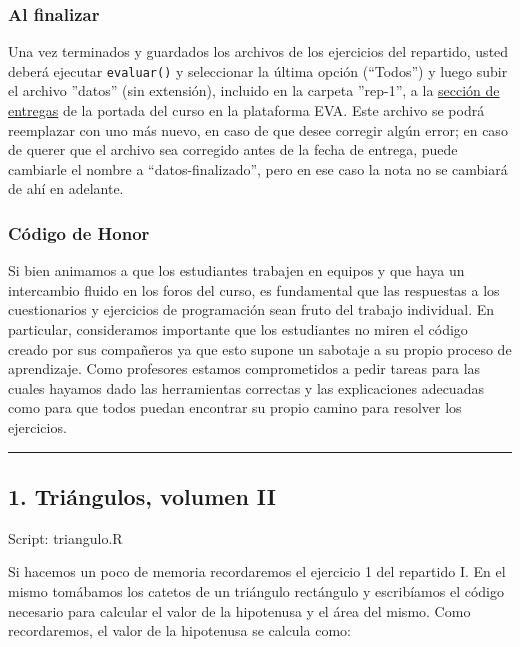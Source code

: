 \documentclass[]{article}
\begin{document}
\subsubsection{Al finalizar}

Una vez terminados y guardados los archivos de los ejercicios del
repartido, usted deberá ejecutar \texttt{evaluar()} y seleccionar la
última opción (``Todos'') y luego subir el archivo ''datos'' (sin
extensión), incluido en la carpeta ''rep-1'', a la
\href{http://eva.universidad.edu.uy/mod/assignment/view.php?id=95125}{sección
de entregas} de la portada del curso en la plataforma EVA. Este archivo
se podrá reemplazar con uno más nuevo, en caso de que desee corregir
algún error; en caso de querer que el archivo sea corregido antes de la
fecha de entrega, puede cambiarle el nombre a ``datos-finalizado'', pero
en ese caso la nota no se cambiará de ahí en adelante.

\subsubsection{Código de Honor}

Si bien animamos a que los estudiantes trabajen en equipos y que haya un
intercambio fluido en los foros del curso, es fundamental que las
respuestas a los cuestionarios y ejercicios de programación sean fruto
del trabajo individual. En particular, consideramos importante que los
estudiantes no miren el código creado por sus compañeros ya que esto
supone un sabotaje a su propio proceso de aprendizaje. Como profesores
estamos comprometidos a pedir tareas para las cuales hayamos dado las
herramientas correctas y las explicaciones adecuadas como para que todos
puedan encontrar su propio camino para resolver los ejercicios.

\begin{center}\rule{3in}{0.4pt}\end{center}

\subsection{1. Triángulos, volumen II}

Script: triangulo.R

Si hacemos un poco de memoria recordaremos el ejercicio 1 del repartido
I. En el mismo tomábamos los catetos de un triángulo rectángulo y
escribíamos el código necesario para calcular el valor de la hipotenusa
y el área del mismo. Como recordaremos, el valor de la hipotenusa se
calcula como:
\end{document}
